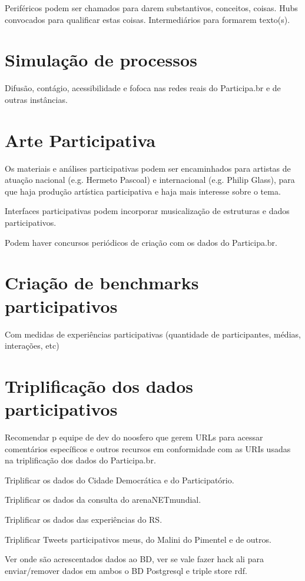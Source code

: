 \documentclass[12pt]{report}
\begin{document}
Periféricos podem ser chamados para darem substantivos, conceitos, coisas.
Hubs convocados para qualificar estas coisas. Intermediários para formarem texto(s).
\chapter{Simulação de processos}

Difusão, contágio, acessibilidade e fofoca nas redes reais do Participa.br e de outras instâncias.

\chapter{Arte Participativa}
Os materiais e análises participativas podem ser encaminhados para artistas de atuação nacional (e.g. Hermeto Pascoal) e internacional (e.g. Philip Glass), para que haja produção artística participativa e haja mais interesse sobre o tema.

Interfaces participativas podem incorporar musicalização de estruturas e dados participativos.

Podem haver concursos periódicos de criação com os dados do Participa.br.
\chapter{Criação de benchmarks participativos}
Com medidas de experiências participativas (quantidade de participantes, médias, interações, etc)

\chapter{Triplificação dos dados participativos}
Recomendar p equipe de dev do noosfero que gerem URLs para acessar comentários específicos e outros recursos em conformidade com as URIs usadas na triplificação dos dados do Participa.br.

Triplificar os dados do Cidade Democrática e do Participatório.

Triplificar os dados da consulta do arenaNETmundial.

Triplificar os dados das experiências do RS.

Triplificar Tweets participativos meus, do Malini do Pimentel e de outros.

Ver onde são acrescentados dados ao BD, ver se vale fazer hack ali para enviar/remover dados em ambos o BD Postgresql e triple store rdf.

\newpage

\newpage

\newpage
\printindex
\newpage
%
\appendix
\end{document}
